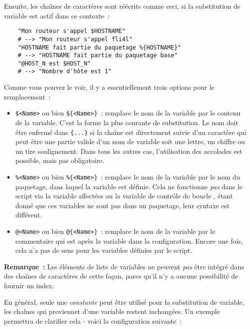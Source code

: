     Ensuite, les chaînes de caractères sont réécrits comme ceci, si la substitution
	de variable est actif dans ce contexte~:

\begin{example}
\begin{verbatim}
    "Mon routeur s'appel $HOSTNAME"
    # --> "Mon routeur s'appel fli4l"
    "HOSTNAME fait partie du paquetage %{HOSTNAME}"
    # --> "HOSTNAME fait partie du paquetage base"
    "@HOST_N est $HOST_N"
    # --> "Nombre d'hôte est 1"
\end{verbatim}
\end{example}

    Comme vous pouvez le voir, il y a essentiellement trois options pour le remplacement~:
    \begin{itemize}
    \item \texttt{\$<Name>} ou bien \texttt{\$\{<Name>\}}~: remplace le nom de
	la variable par le contenu de la variable. C'est la forme la plus courante de
	substitution. Le nom doit être enfermé dans \texttt{\{...\}} si la chaîne est
	directement suivie d'un caractère qui peut être une partie valide d'un nom de variable
	soit une lettre, un chiffre ou un tire soulignement. Dans tous les autres cas,
	l'utilisation des accolades est possible, mais pas obligatoire.

    \item \texttt{\%<Name>} ou bien \texttt{\%\{<Name>\}}~: remplace le nom de
	la variable par le nom du paquetage, dans laquel la variable est définie. Cela
	ne fonctionne \emph{pas} dans le script via la variable affectées
	 ou la variable de contrôle de boucle
	, étant donné que ces variables ne sont
	pas dans un paquetage, leur syntaxe est différent.

    \item \texttt{@<Name>} ou bien \texttt{@\{<Name>\}}~: remplace le nom de
	la variable par le commentaire qui est après la variable dans la configuration.
	Encore une fois, cela n'a pas de sens pour les variables définies par le script.
    \end{itemize}

    \textbf{Remarque~:} Les éléments de liste de variables ne peuvent \emph{pas}
	être intégré dans des chaînes de caractères de cette façon, parce qu'il n'y a
	aucune possibilité de fournir un index.

    En général, seule une \emph{constante} peut être utilisé pour la substitution
	de variable, les chaînes qui proviennet d'une variable restent inchangées.
	Un exemple permettra de clarifier cela - voici la configuration suivante~:

